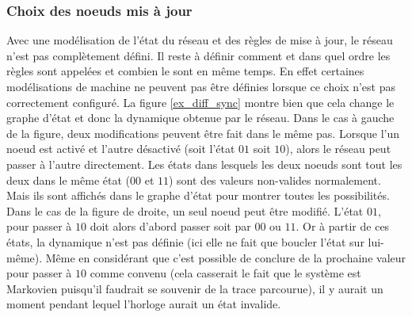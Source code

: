 \documentclass[11pt, a4paper]{article}
\begin{document}
\subsubsection{Choix des noeuds mis à jour}
Avec une modélisation de l'état du réseau et des règles de mise à jour, le
réseau n'est pas complètement défini. Il reste à définir comment et dans quel
ordre les règles sont appelées et combien le sont en même temps. En effet
certaines modélisations de machine ne peuvent pas être définies lorsque ce
choix n'est pas correctement configuré. La figure \ref{ex_diff_sync} montre
bien que cela change le graphe d'état et donc la dynamique obtenue par le
réseau. Dans le cas à gauche de la figure, deux modifications peuvent être fait
dans le même pas.  Lorsque l'un noeud est activé et l'autre désactivé (soit
l'état $01$ soit $10$), alors le réseau peut passer à l'autre directement. Les
états dans lesquels les deux noeuds sont tout les deux dans le même état ($00$
et $11$) sont des valeurs non-valides normalement. Mais ils sont affichés dans
le graphe d'état pour montrer toutes les possibilités. Dans le cas de la figure
de droite, un seul noeud peut être modifié. L'état $01$, pour passer à $10$
doit alors d'abord passer soit par $00$ ou $11$. Or à partir de ces états, la
dynamique n'est pas définie (ici elle ne fait que boucler l'état sur lui-même).
Même en considérant que c'est possible de conclure de la prochaine valeur pour
passer à $10$ comme convenu (cela casserait le fait que le système est
Markovien puisqu'il faudrait se souvenir de la trace parcourue), il y aurait un
moment pendant lequel l'horloge aurait un état invalide.
\end{document}
